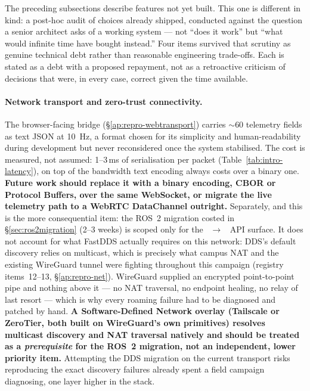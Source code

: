 The preceding subsections describe features not yet built. This one is
different in kind: a post-hoc audit of choices already shipped, conducted
against the question a senior architect asks of a working system --- not
``does it work'' but ``what would infinite time have bought instead.'' Four
items survived that scrutiny as genuine technical debt rather than reasonable
engineering trade-offs. Each is stated as a debt with a proposed repayment,
not as a retroactive criticism of decisions that were, in every case,
correct given the time available.

\paragraph{Network transport and zero-trust connectivity.}
The browser-facing bridge (\S\ref{ap:repro-webtransport}) carries $\sim$60
telemetry fields as text JSON at 10~Hz, a format chosen for its simplicity
and human-readability during development but never reconsidered once the
system stabilised. The cost is measured, not assumed: 1--3\,ms of
serialisation per packet (Table~\ref{tab:intro-latency}), on top of the
bandwidth text encoding always costs over a binary one. \textbf{Future work
should replace it with a binary encoding, CBOR or Protocol Buffers, over the
same WebSocket, or migrate the live telemetry path to a WebRTC DataChannel
outright.} Separately, and this is the more consequential item: the ROS~2
migration costed in \S\ref{sec:ros2migration} (2--3 weeks) is scoped only for the
~$\to$~ API surface. It does not account for what
FastDDS actually requires on this network: DDS's default discovery relies on
multicast, which is precisely what campus NAT and the existing WireGuard
tunnel were fighting throughout this campaign (registry items~12--13,
\S\ref{ap:repro-net}). WireGuard supplied an encrypted point-to-point pipe
and nothing above it --- no NAT traversal, no endpoint healing, no relay of
last resort --- which is why every roaming failure had to be diagnosed and
patched by hand. \textbf{A Software-Defined Network overlay (Tailscale or
ZeroTier, both built on WireGuard's own primitives) resolves multicast
discovery and NAT traversal natively and should be treated as a
\emph{prerequisite} for the ROS~2 migration, not an independent, lower
priority item.} Attempting the DDS migration on the current transport risks
reproducing the exact discovery failures already spent a field campaign
diagnosing, one layer higher in the stack.

